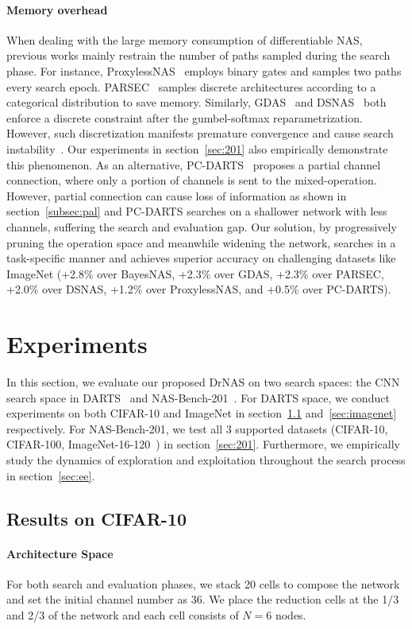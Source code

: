 \documentclass{article} \usepackage{iclr2021_conference,times}
\begin{document}
\paragraph{Memory overhead} When dealing with the large memory consumption of differentiable NAS, previous works mainly restrain the number of paths sampled during the search phase.
For instance, ProxylessNAS~\citep{proxylessnas} employs binary gates and samples two paths every search epoch.
PARSEC~\citep{parsec} samples discrete architectures according to a categorical distribution to save memory.  
Similarly, GDAS~\citep{gdas} and DSNAS~\citep{dsnas} both enforce a discrete constraint after the gumbel-softmax reparametrization. However, such discretization manifests premature convergence and cause search instability~\citep{nasbench1shot1, mmf}. Our experiments in section~\ref{sec:201} also empirically demonstrate this phenomenon. 
As an alternative, PC-DARTS~\citep{pcdarts} proposes a partial channel connection, where only a portion of channels is sent to the mixed-operation.
However, partial connection can cause loss of information as shown in section~\ref{subsec:pal} and PC-DARTS searches on a shallower network with less channels, suffering the search and evaluation gap.
Our solution, by progressively pruning the operation space and meanwhile widening the network, searches in a task-specific manner and achieves superior accuracy on challenging datasets like ImageNet (+2.8\% over BayesNAS, +2.3\% over GDAS, +2.3\% over PARSEC, +2.0\% over DSNAS, +1.2\% over ProxylessNAS, and +0.5\% over PC-DARTS).


\section{Experiments}
In this section, we evaluate our proposed DrNAS on two search spaces: the CNN search space in DARTS~\citep{darts} and NAS-Bench-201~\citep{nasbench201}. For DARTS space, we conduct experiments on both CIFAR-10 and ImageNet in section~\ref{sec:cifar10} and~\ref{sec:imagenet} respectively. For NAS-Bench-201, we test all 3 supported datasets (CIFAR-10, CIFAR-100, ImageNet-16-120~\citep{imagenet16}) in section~\ref{sec:201}. Furthermore, we empirically study the dynamics of exploration and exploitation throughout the search process in section~\ref{sec:ee}.
\subsection{Results on CIFAR-10}
\label{sec:cifar10}
\paragraph{Architecture Space}
For both search and evaluation phases, we stack 20 cells to compose the network and set the initial channel number as 36. We place the reduction cells at the 1/3 and 2/3 of the network and each cell consists of $N=6$ nodes. 
\end{document}
